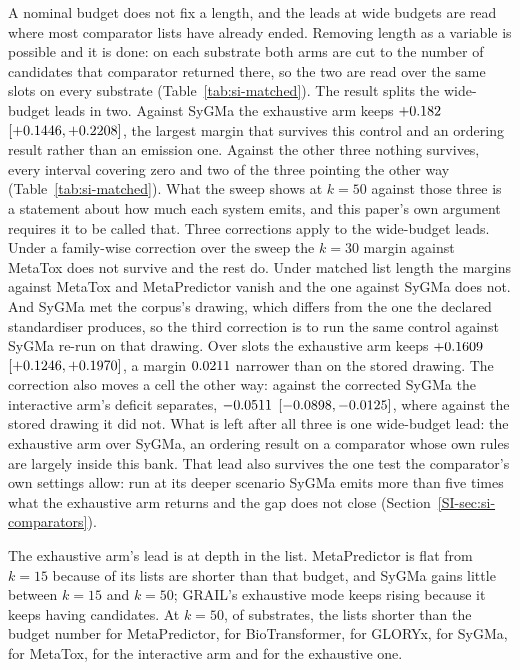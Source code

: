 A nominal budget does not fix a length, and the leads at wide budgets are read where most comparator
lists have already ended. Removing length as a variable is possible and it is done: on each
substrate both arms are cut to the number of candidates that comparator returned there, so the two
are read over the same slots on every substrate (Table~\ref{tab:si-matched}). The result splits
the wide-budget leads in two. Against SyGMa the exhaustive arm keeps $+0.182$
$[+0.1446, +0.2208]$, the largest margin that survives this
control and
an ordering result rather than an emission one. Against the other three nothing survives, every interval covering zero and two of the three pointing the other way (Table~\ref{tab:si-matched}). What the sweep shows at $k=50$
against those three is a statement about how much each system emits, and this paper's own
argument requires it to be called that.
Three corrections apply to the wide-budget leads.
Under a family-wise correction over the sweep the $k=30$ margin against MetaTox does not survive
and the rest do. Under matched list length the margins against MetaTox and MetaPredictor vanish
and the one against SyGMa does not. And SyGMa met the corpus's drawing, which differs from the one the
declared standardiser produces, so the third correction is to run the same control against SyGMa
re-run on that drawing. Over \numMatchedBanksygmastdSlots{} slots the exhaustive arm keeps
$+0.1609$ $[+0.1246, +0.1970]$, a margin
$0.0211$ narrower than on the stored drawing.  The correction also moves a cell the other way: against the corrected SyGMa the
interactive arm's deficit separates,
$-0.0511$ $[-0.0898, -0.0125]$,
where against the stored drawing it did not. What is left after all three is one wide-budget lead:
the exhaustive arm over SyGMa, an ordering result on a comparator whose own rules are largely
inside this bank. That lead also survives the one test the comparator's own settings allow: run at its deeper scenario SyGMa emits more than five times what the exhaustive arm returns and the gap does not close (Section~\ref{SI-sec:si-comparators}).

The exhaustive arm's lead is at depth in the list. MetaPredictor is flat from $k=15$
because \numShortMetapredictorOneFive{} of its \numPopulationN{} lists are shorter than that
budget, and SyGMa gains little between $k=15$ and $k=50$; GRAIL's exhaustive mode keeps rising
because it keeps having candidates. At $k=50$, of
\numPopulationN{} substrates, the lists shorter than the budget number
\numShortMetapredictorFiveZero{} for MetaPredictor, \numShortBiotransformerFiveZero{} for
BioTransformer, \numShortGxarmFiveZero{} for GLORYx, \numShortSygmaFiveZero{} for SyGMa,
\numShortMetatoxFiveZero{} for MetaTox, \numShortTrainedFiveZero{} for the interactive arm and
\numShortBankFiveZero{} for the exhaustive one.

